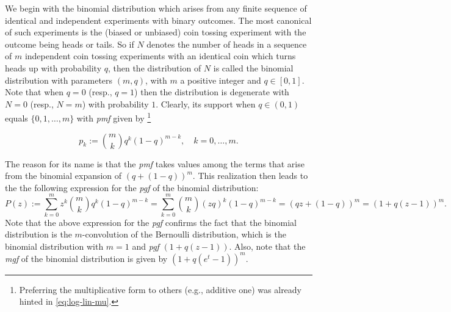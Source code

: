 \documentclass[]{book}
\let\rmarkdownfootnote\footnote%
\def\footnote{\protect\rmarkdownfootnote}
\theoremstyle{definition}
\theoremstyle{definition}
\theoremstyle{definition}
\theoremstyle{remark}
\begin{document}
We begin with the binomial distribution which arises from any finite
sequence of identical and independent experiments with binary outcomes.
The most canonical of such experiments is the (biased or unbiased) coin
tossing experiment with the outcome being heads or tails. So if \(N\)
denotes the number of heads in a sequence of \(m\) independent coin
tossing experiments with an identical coin which turns heads up with
probability \(q\), then the distribution of \(N\) is called the binomial
distribution with parameters \((m,q)\), with \(m\) a positive integer
and \(q\in[0,1]\). Note that when \(q=0\) (resp., \(q=1\)) then the
distribution is degenerate with \(N=0\) (resp., \(N=m\)) with
probability \(1\). Clearly, its support when \(q\in(0,1)\) equals
\(\{0,1,\ldots,m\}\) with \emph{pmf} given by \footnote{Preferring the
  multiplicative form to others (e.g., additive one) was already hinted
  in \eqref{eq:log-lin-mu}.}

\begin{equation*}
p_k:= \binom{m}{k} q^k (1-q)^{m-k}, \quad k=0,\ldots,m.
\end{equation*}

The reason for its name is that the \emph{pmf} takes values among the
terms that arise from the binomial expansion of \((q +(1-q))^m\). This
realization then leads to the the following expression for the
\emph{pgf} of the binomial distribution: \[
P(z):= \sum_{k=0}^m z^k \binom{m}{k} q^k (1-q)^{m-k} = \sum_{k=0}^m  \binom{m}{k} (zq)^k (1-q)^{m-k} = (qz+(1-q))^m = (1+q(z-1))^m.
\] Note that the above expression for the \emph{pgf} confirms the fact
that the binomial distribution is the \(m\)-convolution of the Bernoulli
distribution, which is the binomial distribution with \(m=1\) and
\emph{pgf} \((1+q(z-1))\). Also, note that the \emph{mgf} of the
binomial distribution is given by \((1+q(e^t-1))^m\).
\end{document}

